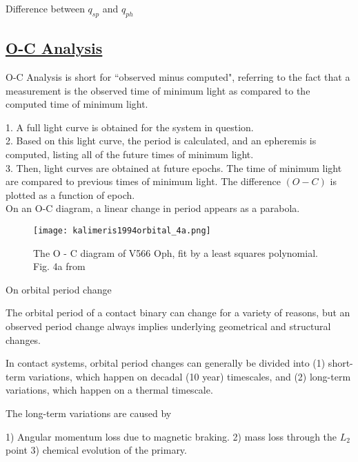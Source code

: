\documentclass[12pt]{article} %
\numberwithin{equation}{section} %
\begin{document}
Difference between $q_{sp}$ and $q_{ph}$ \citep{van1985contribution}

\citep{rucinski1973w} \citep{rucinski1993light} \citep{terrell2005photometric} \citep{hambalek2013}

\subsection[O-C Analysis]{\hyperlink{toc}{O-C Analysis}} \label{sec: O-C Analysis}

O-C Analysis is short for ``observed minus computed", referring to the fact that a measurement is the observed time of minimum light as compared to the computed time of minimum light. 

1. A full light curve is obtained for the system in question. \\
2. Based on this light curve, the period is calculated, and an epheremis is computed, listing all of the future times of minimum light. \\
3. Then, light curves are obtained at future epochs. The time of minimum light are compared to previous times of minimum light. The difference $(O-C)$ is plotted as a function of epoch. \\

On an O-C diagram, a linear change in period appears as a parabola.

\begin{figure}[H]
\centering
\texttt{[image: kalimeris1994orbital\_4a.png]}
\caption{ The O - C diagram of V566 Oph, fit by a least squares polynomial. Fig. 4a from \citet{kalimeris1994orbital}}
\label{fig: kalimeris1994orbital_4a}
\end{figure}

On orbital period change \citep{kalimeris1994orbital}

The orbital period of a contact binary can change for a variety of reasons, but an observed period change always implies underlying geometrical and structural changes.

In contact systems, orbital period changes can generally be divided into (1) short-term variations, which happen on decadal (10 year) timescales, and (2) long-term variations, which happen on a thermal timescale.

The long-term variations are caused by

1) Angular momentum loss due to magnetic braking.
2) mass loss through the $L_{2}$ point 
3) chemical evolution of the primary.
\end{document}
